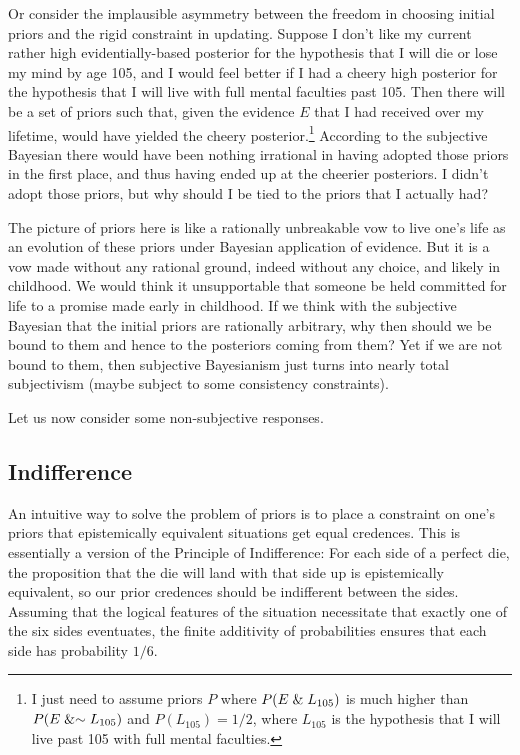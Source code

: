 Or consider the implausible asymmetry between the freedom in choosing initial priors and the
rigid constraint in updating. Suppose I don't like my current rather high evidentially-based posterior for 
the hypothesis that I will die or lose my mind by age 105, and I would feel better if I had a cheery high posterior for 
the hypothesis that I will live with full mental faculties past 105.  Then there will be a set of priors 
such that, given the evidence $E$ that I had received over my lifetime, would have yielded the cheery 
posterior.\footnote{I just need to assume priors $P$ where $P(E\mathrel{\&} L_{105})$ is much higher than 
$P(E\mathrel{\&} \sim L_{105})$ and $P(L_{105})=1/2$, where $L_{105}$ is the hypothesis that I will live past 105 with full mental faculties.} According to 
the subjective Bayesian there would have been nothing irrational in having adopted those priors in 
the first place, and thus having ended up at the cheerier posteriors. I didn't adopt those priors, 
but why should I be tied to the priors that I actually had? 

The picture of priors here is like a rationally unbreakable vow to live one's life as an evolution
of these priors under Bayesian application of evidence. But it is a vow made without any rational 
ground, indeed without any choice, and likely in childhood. We would think it unsupportable that
someone be held committed for life to a promise made early in childhood. If we think with the subjective
Bayesian that the initial priors are rationally arbitrary, why then should we be bound to
them and hence to the posteriors coming from them? Yet if we are not bound to them, then subjective
Bayesianism just turns into nearly total subjectivism (maybe subject to some consistency constraints).

Let us now consider some non-subjective responses.

\subsection{Indifference}
An intuitive way to solve the problem of priors is to place a constraint on one's priors that 
epistemically equivalent situations get equal credences. This is essentially a version of the 
Principle of Indifference: For each side of a perfect die, the proposition that the die will land 
with that side up is epistemically equivalent, so our prior credences should be indifferent between
the sides. Assuming that the logical features of the situation necessitate that exactly one of the six 
sides eventuates, the finite additivity of probabilities ensures that each side has probability $1/6$.

